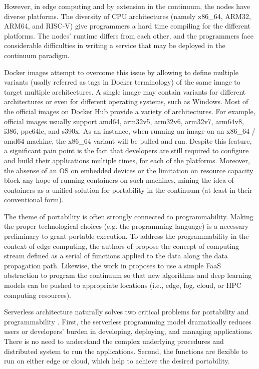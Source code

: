 However, in edge computing and by extension in the continuum, the nodes have diverse platforms. The diversity of CPU architectures (namely x86\_64, ARM32, ARM64, and RISC-V) give programmers a hard time compiling for the different platforms. The nodes' runtime differs from each other, and the programmers face considerable difficulties in writing a service that may be deployed in the continuum paradigm.

Docker images attempt to overcome this issue by allowing to define multiple variants (usally referred as tags in Docker terminology) of the same image to target multiple architectures. A single image may contain variants for different architectures or even for different operating systems, such as Windows. Most of the official images on Docker Hub \cite{docker-hub} provide a variety of architectures. For example, official images usually support amd64, arm32v5, arm32v6, arm32v7, arm64v8, i386, ppc64le, and s390x. As an instance, when running an image on an x86\_64 / amd64 machine, the x86\_64 variant will be pulled and run. Despite this feature, a significant pain point is the fact that developers are still required to configure and build their applications multiple times, for each of the platforms. Moreover, the absense of an OS on embedded devices or the limitation on resource capacity block any hope of running containers on such machines, mining the idea of containers as a unified solution for portability in the continuum (at least in their conventional form).

The theme of portability is often strongly connected to programmability. Making the proper technological choices (e.g. the programming language) is a necessary preliminary to grant portable execution. To address the programmability in the context of edge computing, the authors of \cite{edge-computing-vision-challenges} propose the concept of computing stream defined as a serial of functions applied to the data along the data propagation path. Likewise, the work in \cite{harnessing-continuum} proposes to use a simple FaaS abstraction to program the continuum so that new algorithms and deep learning models can be pushed to appropriate locations (i.e., edge, fog, cloud, or HPC computing resources).

Serverless architecture naturally solves two critical problems for portability and programmability \cite{lavea}. First, the serverless programming model dramatically reduces users or developers' burden in developing, deploying, and managing applications. There is no need to understand the complex underlying procedures and distributed system to run the applications. Second, the functions are flexible to run on either edge or cloud, which help to achieve the desired portability.

